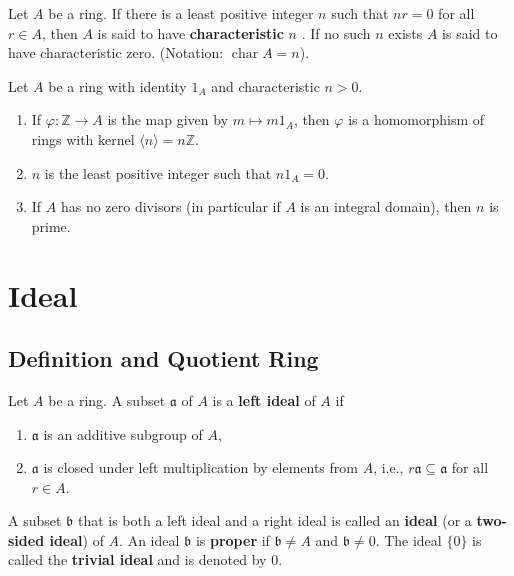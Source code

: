 \begin{definition}
    Let $A$ be a ring.
    If there is a least positive integer $n$ such that $nr=0$ for all $r \in A$, then $A$ is said to have \textbf{characteristic} $n$ . If no such $n$ exists $A$ is said to have characteristic zero. (Notation: $\operatorname{char}{A}={n}$).
\end{definition}


\begin{theorem}
    Let $A$ be a ring with identity $1_{A}$ and characteristic ${n}>0$.
    \begin{enumerate}
        \item
              If $\varphi: \mathbb{Z} \rightarrow A$ is the map given by ${m} \mapsto m 1_{{A}}$, then $\varphi$ is a homomorphism of rings with kernel $\langle{n}\rangle=n\mathbb{Z}$.

        \item
              $n$ is the least positive integer such that ${n} 1_{{A}}=0$.

        \item
              If $A$ has no zero divisors (in particular if $A$ is an integral domain), then $n$ is prime.
    \end{enumerate}
\end{theorem}


\section{Ideal} %
\subsection{Definition and Quotient Ring} %
\begin{definition}
    Let $A$ be a ring.
    A subset $\mathfrak{a}$ of $A$ is a \textbf{left ideal} of $A$ if
    \begin{enumerate}[label=(\roman*)]
        \item
              $\mathfrak{a}$ is an additive subgroup of $A$,
        \item
              $\mathfrak{a}$ is closed under left multiplication by elements from $A$, i.e., $r \mathfrak{a} \subseteq \mathfrak{a}$ for all $r \in A$.
    \end{enumerate}
    A subset $\mathfrak{b}$ that is both a left ideal and a right ideal is called an \textbf{ideal} (or a \textbf{two-sided ideal}) of $A$.
    An ideal $\mathfrak{b}$ is \textbf{proper} if $\mathfrak{b} \neq A$ and $\mathfrak{b} \neq 0$. The ideal $\{0\}$ is called the \textbf{trivial ideal} and is denoted by $0$.
\end{definition}

